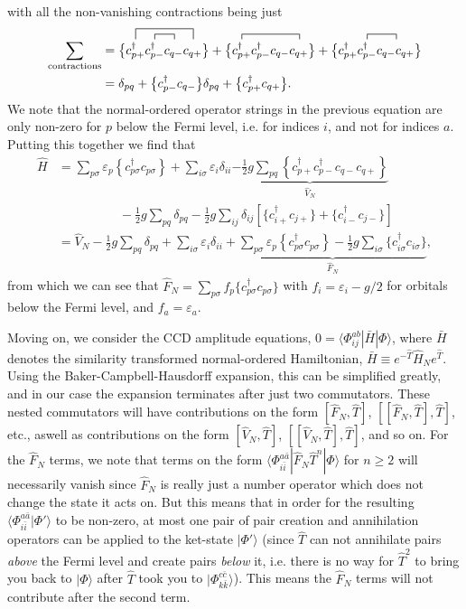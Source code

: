 \documentclass[a4paper]{article}
\newcommand{\nn}{\nonumber}
\newcommand{\ps}{{p\sigma}}
\newcommand{\cppd}{c_{p+}^\dagger}
\newcommand{\cpmd}{c_{p-}^\dagger}
\newcommand{\cqp}{c_{q+}}
\newcommand{\cqm}{c_{q-}}
\begin{document}
with all the non-vanishing contractions being just
\begin{align}
\sum_\text{contractions} &= \big\{ \contraction[2ex]{}{\cppd}{\cpmd \cqm}{\cqp}\contraction[1ex]{\cppd}{\cpmd}{}{\cqm}\cppd \cpmd \cqm \cqp \big\} + \big\{\contraction{}{\cppd}{\cpmd \cqm}{\cqp}\cppd \cpmd \cqm \cqp \big\} + \big\{\contraction{\cppd}{\cpmd}{\cqm}{}\cppd \cpmd \cqm \cqp \big\} \nn\\
%
&= \delta_{pq} + \big\{ \cpmd \cqm \big\} \delta_{pq} + \big\{ \cppd \cqp \big\}.
\end{align}
We note that the normal-ordered operator strings in the previous equation are only non-zero for $p$ below the Fermi level, i.e. for indices $i$, and not for indices $a$. Putting this together we find that
\begin{align}
\hat H &= \sum_\ps \varepsilon_p\left\{ c_\ps^\dagger c_\ps \right\} + \sum_{i\sigma}\varepsilon_i \delta_{ii} \underbrace{-\frac{1}{2}g\sum_{pq} \left\{\cppd \cpmd \cqm \cqp \right\}}_{\hat V_N} \nn\\
& \ \ \ \ \ \ \ \ \ \ \ \ \ \ \ \ \ \ \ \ \ \ -\frac{1}{2}g \sum_{pq}\delta_{pq} -\frac{1}{2}g\sum_{ij}\delta_{ij}\left[\big\{ c_{i+}^\dagger c_{j+}\big\} + \big\{ c_{i-}^\dagger c_{j-} \big\} \right]\nn\\
%
&= \hat V_N -\frac{1}{2}g \sum_{pq}\delta_{pq}+ \sum_{i\sigma}\varepsilon_i \delta_{ii} + \underbrace{\sum_\ps \varepsilon_p\left\{ c_\ps^\dagger c_\ps \right\}-\frac{1}{2}g \sum_{i\sigma} \big\{ c_{i\sigma}^\dagger c_{i\sigma} \big\}}_{\hat F_N},
\end{align}
from which we can see that $\hat F_N=\sum_\ps f_p \big\{c_\ps^\dagger c_\ps \big\}$ with $f_i=\varepsilon_i-g/2$ for orbitals below the Fermi level, and $f_a=\varepsilon_a$.

Moving on, we consider the CCD amplitude equations, $0=\langle \Phi_{ij}^{ab}|\bar H | \Phi\rangle$, where $\bar H$ denotes the similarity transformed normal-ordered Hamiltonian, $\bar H \equiv e^{-\hat T}\hat H_N e^{\hat T}$. Using the Baker-Campbell-Hausdorff expansion, this can be simplified greatly, and in our case the expansion terminates after just two commutators. These nested commutators will have contributions on the form $[\hat F_N, \hat T]$, $[[\hat F_N, \hat T], \hat T]$, etc., aswell as contributions on the form $[\hat V_N, \hat T]$, $[[\hat V_N, \hat T], \hat T]$, and so on. For the $\hat F_N$ terms, we note that terms on the form $\langle \Phi_{i\bar i}^{a \bar a} | \hat F_N \hat T^n|\Phi\rangle$ for $n\ge2$ will necessarily vanish since $\hat F_N$ is really just a number operator which does not change the state it acts on. But this means that in order for the resulting $\langle \Phi_{i\bar i}^{a\bar a}|\Phi'\rangle$ to be non-zero, at most one pair of pair creation and annihilation operators can be applied to the ket-state $|\Phi'\rangle$ (since $\hat T$ can not annihilate pairs \emph{above} the Fermi level and create pairs \emph{below} it, i.e. there is no way for $\hat T^2$ to bring you back to $|\Phi\rangle$ after $\hat T$ took you to $|\Phi_{k\bar k}^{c\bar c}\rangle$). This means the $\hat F_N$ terms will not contribute after the second term.
\end{document}
